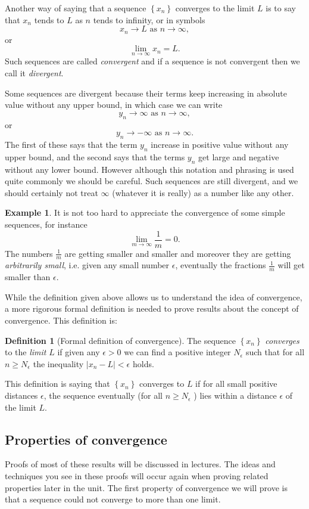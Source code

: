\documentclass[extrafontsizes, twoside, a4paper]{memoir}
\theoremstyle{plain}%
\theoremstyle{definition}
\newtheorem{defn}{Definition}[chapter]
\newtheorem{exmp}{Example}[chapter]
\theoremstyle{remark}
\begin{document}
Another way of saying that a sequence $\left \{ x_n \right \}$  converges to the limit $L$ is to say that $x_n$ tends to $L$ as $n$ tends to infinity, or in symbols
$$ x_n \to L \text{ as } n \to \infty,$$
or
$$ \lim_{n\to \infty} x_n = L.$$
Such sequences are called \emph{convergent} and if a sequence is not convergent then we call it
\emph{divergent}.

Some sequences are divergent because their terms keep increasing in absolute value without any upper bound, in which case we can write
$$y_n \to \infty \text{ as } n \to \infty,$$
or
$$y_n \to -\infty \text{ as } n \to \infty.$$
The first of these says that the term $y_n$ increase in positive value without any upper bound, and the second says that the terms $y_n$ get large and negative without any lower bound. However although this notation and phrasing is used quite commonly we should be careful. Such sequences are still divergent, and we should certainly not treat $\infty$ (whatever it is really) as a number like any other.

\begin{exmp}
It is not too hard to appreciate the convergence of some simple sequences, for instance
$$ \lim_{m \to \infty} \frac{1}{m} = 0 .$$
The numbers $\frac{1}{m}$ are getting smaller and smaller and moreover they are getting \textit{arbitrarily small}, i.e. given any small number $\epsilon$, eventually the fractions $\frac{1}{m}$ will get smaller than $\epsilon$.
\end{exmp}

While the definition given above allows us to understand the idea of convergence, a more
rigorous formal definition is needed to prove results about the concept of convergence.
This definition is:
\begin{defn}[Formal definition of convergence]
The sequence $\left \{ x_n \right \}$ \emph{converges} to the \emph{limit} $L$ if given any $\epsilon > 0$ we can find a positive integer $N_\epsilon$ such that for all $n \geq N_\epsilon$ the inequality $\left | x_n - L \right | < \epsilon$ holds.
\end{defn}
This definition is saying that $\left \{ x_n \right \}$ converges to $L$ if for all small positive distances $\epsilon$, the sequence eventually (for all $n \geq N_\epsilon$ ) lies within a distance $\epsilon$ of the limit $L$.
\subsection{Properties of convergence}
Proofs of most of these results will be discussed in lectures. The ideas and techniques you see in these proofs will occur again when proving related properties later in the unit.
The first property of convergence we will prove is that a sequence could not converge to more than one limit.
\end{document}
